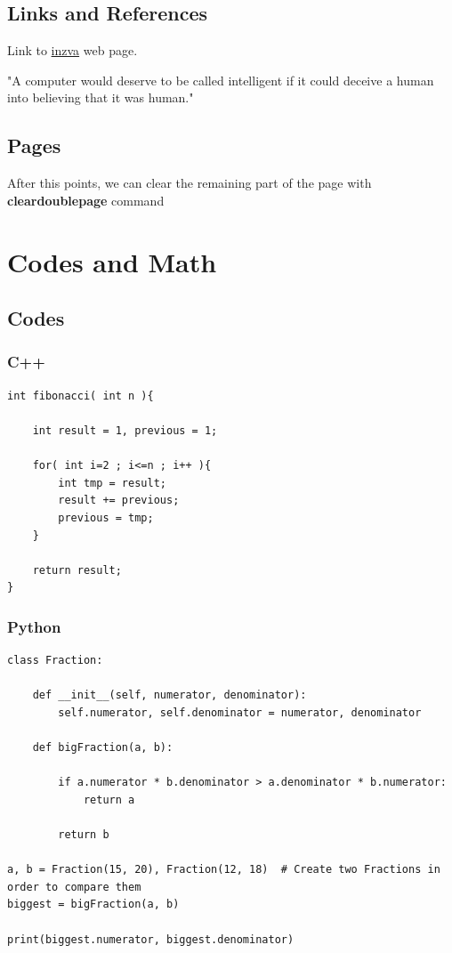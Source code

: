 \documentclass[12pt]{article}
\begin{document}
	\subsection{Links and References}

	Link to \href{https://inzva.com}{inzva} web page.
	
	"A computer would deserve to be called intelligent if it could deceive a human into believing that it was human."\cite{turing}
	
	\subsection{Pages}

	After this points, we can clear the remaining part of the page with \textbf{cleardoublepage} command
	
	\cleardoublepage
	
	\section{Codes and Math}
	
	\subsection{Codes}
	
		\subsubsection{C++}
		
\begin{verbatim}
int fibonacci( int n ){

	int result = 1, previous = 1;

	for( int i=2 ; i<=n ; i++ ){
		int tmp = result;
		result += previous;
		previous = tmp;
	}

	return result;
}
\end{verbatim}
		
		\subsubsection{Python}
		
\begin{verbatim}
class Fraction:

	def __init__(self, numerator, denominator):
		self.numerator, self.denominator = numerator, denominator
	
	def bigFraction(a, b):
	
		if a.numerator * b.denominator > a.denominator * b.numerator:
			return a
	
		return b

a, b = Fraction(15, 20), Fraction(12, 18)  # Create two Fractions in order to compare them
biggest = bigFraction(a, b)

print(biggest.numerator, biggest.denominator)
\end{verbatim}
\end{document}
